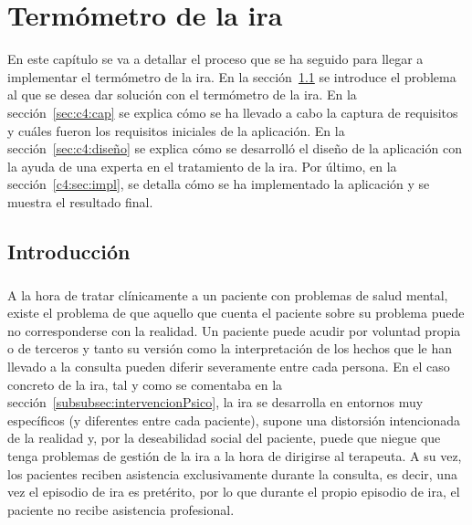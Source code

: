 %
%

\chapter{Termómetro de la ira}

En este capítulo se va a detallar el proceso que se ha seguido para llegar a implementar el termómetro de la ira. En la sección~\ref{sec:c4:intro} se introduce el problema al que se desea dar solución con el termómetro de la ira. En la sección~\ref{sec:c4:cap} se explica cómo se ha llevado a cabo la captura de requisitos y cuáles fueron los requisitos iniciales de la aplicación. En la sección~\ref{sec:c4:diseño} se explica cómo se desarrolló el diseño de la aplicación con la ayuda de una experta en el tratamiento de la ira. Por último, en la sección~\ref{c4:sec:impl}, se detalla cómo se ha implementado la aplicación y se muestra el resultado final.

\section{Introducción}
\label{sec:c4:intro}
\paragraph{}
A la hora de tratar clínicamente a un paciente con problemas de salud mental, existe el problema de que aquello que cuenta el paciente sobre su problema puede no corresponderse con la realidad. Un paciente puede acudir por voluntad propia o de terceros y tanto su versión como la interpretación de los hechos que le han llevado a la consulta pueden diferir severamente entre cada persona. En el caso concreto de la ira, tal y como se comentaba en la sección~\ref{subsubsec:intervencionPsico}, la ira se desarrolla en entornos muy específicos (y diferentes entre cada paciente), supone una distorsión intencionada de la realidad y, por la deseabilidad social del paciente, puede que niegue que tenga problemas de gestión de la ira a la hora de dirigirse al terapeuta. A su vez, los pacientes reciben asistencia exclusivamente durante la consulta, es decir, una vez el episodio de ira es pretérito, por lo que durante el propio episodio de ira, el paciente no recibe asistencia profesional.

